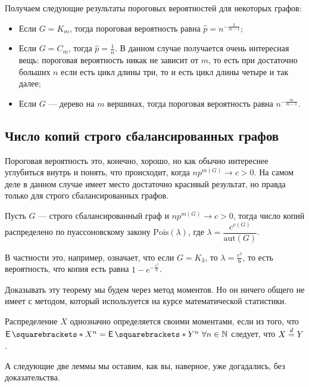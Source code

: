 Получаем следующие результаты пороговых вероятностей для некоторых графов:

\begin{itemize}
  \item Если $G = K_m$, тогда пороговая вероятность равна $\hat{p} = n^{-\frac{2}{m - 1}}$;
  \item Если $G = C_m$, тогда $\hat{p} = \frac1n$. В данном случае получается очень 
  интересная вещь: пороговая вероятность никак не зависит от $m$, то есть при достаточно
  больших $n$ если есть цикл длины три, то и есть цикл длины четыре и так далее;
  \item Если $G$ --- дерево на $m$ вершинах, тогда пороговая вероятность равна 
  $n^{-\frac{m}{m - 1}}$.
\end{itemize}

\subsection{Число копий строго сбалансированных графов}

Пороговая вероятность это, конечно, хорошо, но как обычно интереснее углубиться
внутрь и понять, что происходит, когда $np^{m(G)} \to c > 0$. На самом деле в
данном случае имеет место достаточно красивый результат, но правда только для
строго сбалансированных графов.

\begin{theorem}[Б. Боллобаш]
  Пусть $G$ --- строго сбалансированный граф и $n p^{m(G)} \to c > 0$, тогда
  число копий распределено по пуассоновскому закону $\mathrm{Pois}(\lambda)$, где
  $\lambda = \dfrac{c^{v(G)}}{\mathrm{aut}(G)}$.
\end{theorem}

В частности это, например, означает, что если $G = K_3$, то $\lambda = \frac{c^3}{6}$,
то есть вероятность, что копия есть равна $1 - e^{-\frac{c^3}{6}}$.

Доказывать эту теорему мы будем через метод моментов. Но он ничего общего не имеет
с методом, который
используется на курсе математической статистики.

\begin{definition}
  Распределение $X$ однозначно определяется своими моментами, если из того,
  что $\E{X^n} = \E{Y^n} \ \forall n \in \N$ следует, что $X \overset{d}{=} Y$.
\end{definition}

А следующие две леммы мы оставим, как вы, наверное, уже догадались, без доказательства.

